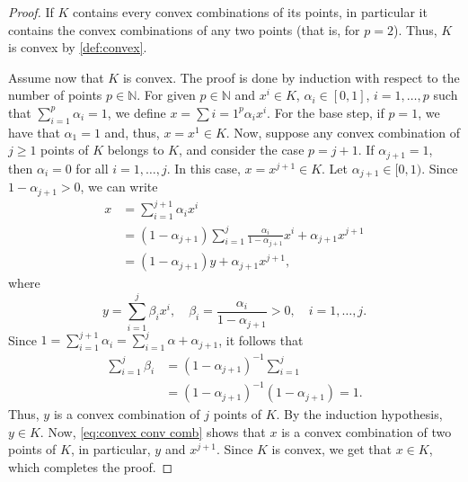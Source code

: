 \documentclass[smallextended,numbook,nospthms]{svjour3}
\theoremstyle{plain}
\theoremstyle{definition}
\def\NN{\mathds N}
\begin{document}
\begin{proof}
	If $K$ contains every convex combinations of its points, in particular it contains the convex combinations of any two points (that is, for $p=2$). Thus, $K$ is convex by \cref{def:convex}.
	
	Assume now that $K$ is convex. The proof is done by induction with respect to the number of points $p \in \NN$. For given $p \in \NN$ and $x^{i} \in K$, $\alpha_{i} \in [0,1]$, $i=1,\ldots,p$ such that $\sum_{i=1}^{p} \alpha_{i}=1$, we define $x=\sum{i=1}^{p} \alpha_{i}x^{i}$.
	For the base step, if $p=1$, we have that $\alpha_{1}=1$ and, thus, $x=x^{1} \in K$.
	Now, suppose any convex combination of $j \geq 1$ points of $K$ belongs to $K$, and consider the case $p=j+1$.
	If $\alpha_{j+1}=1$, then $\alpha_{i}=0$ for all $i=1,\ldots,j$. In this case, $x=x^{j+1} \in K$.
	Let $\alpha_{j+1} \in [0,1)$. Since $1-\alpha_{j+1}>0$, we can write
	\begin{align}
		x &= \sum_{i=1}^{j+1} \alpha_{i}x^{i} \\
		  &= (1-\alpha_{j+1})\sum_{i=1}^{j} \frac{\alpha_{i}}{1-\alpha_{j+1}}x^{i} + \alpha_{j+1}x^{j+1} \\
		  &= (1-\alpha_{j+1})y + \alpha_{j+1}x^{j+1}, \label{eq:convex conv comb}
	\end{align}
	where
	\[
	y=\sum_{i=1}^{j}\beta_{i}x^{i}, \quad \beta_{i}=\frac{\alpha_{i}}{1-\alpha_{j+1}}>0, \quad i=1,\ldots,j.
	\]
	Since $1=\sum_{i=1}^{j+1}\alpha_{i}=\sum_{i=1}^{j}\alpha + \alpha_{j+1}$, it follows that
	\begin{align}
		\sum_{i=1}^{j} \beta_{i} &= \left(1-\alpha_{j+1}\right)^{-1}\sum_{i=1}^{j} \\
			&= \left(1-\alpha_{j+1}\right)^{-1}\left(1-\alpha_{j+1}\right)=1.
	\end{align}
	Thus, $y$ is a convex combination of $j$ points of $K$. By the induction hypothesis, $y \in K$. Now, \cref{eq:convex conv comb} shows that $x$ is a convex combination of two points of $K$, in particular, $y$ and $x^{j+1}$. Since $K$ is convex, we get that $x \in K$, which completes the proof.
\end{proof}
\end{document}

